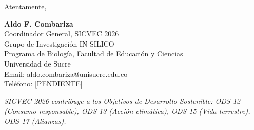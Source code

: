 \documentclass[12pt,a4paper]{article}
\begin{document}
Atentamente,

\vspace{2cm}

\textbf{Aldo F. Combariza}\\
Coordinador General, SICVEC 2026\\
Grupo de Investigación IN SILICO\\
Programa de Biología, Facultad de Educación y Ciencias\\
Universidad de Sucre\\
Email: aldo.combariza@unisucre.edu.co\\
Teléfono: [PENDIENTE]

\vspace{1cm}

\noindent
\textit{SICVEC 2026 contribuye a los Objetivos de Desarrollo Sostenible: ODS 12 (Consumo responsable), ODS 13 (Acción climática), ODS 15 (Vida terrestre), ODS 17 (Alianzas).}
\end{document}
